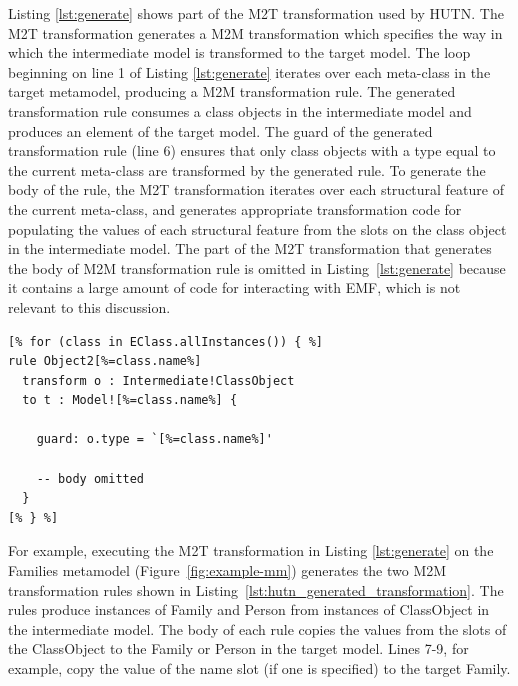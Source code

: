Listing \ref{lst:generate} shows part of the M2T transformation used by HUTN. The M2T transformation generates a M2M transformation which specifies the way in which the intermediate model is transformed to the target model. The loop beginning on line 1 of Listing \ref{lst:generate} iterates over each meta-class in the target metamodel, producing a M2M transformation rule. The generated transformation rule consumes a class objects in the intermediate model and produces an element of the target model. The guard of the generated transformation rule (line 6) ensures that only class objects with a type equal to the current meta-class are transformed by the generated rule. To generate the body of the rule, the M2T transformation iterates over each structural feature of the current meta-class, and generates appropriate transformation code for populating the values of each structural feature from the slots on the class object in the intermediate model. The part of the M2T transformation that generates the body of M2M transformation rule is omitted in Listing~\ref{lst:generate} because it contains a large amount of code for interacting with EMF, which is not relevant to this discussion.

\begin{lstlisting}[caption={[Higher-order transformation with EGL]Part of the M2T transformation (in EGL) for generating the intermediate model to target model transformation (in ETL).}, label=lst:generate, language=EGL]
[% for (class in EClass.allInstances()) { %]
rule Object2[%=class.name%]
  transform o : Intermediate!ClassObject
  to t : Model![%=class.name%] {

    guard: o.type = `[%=class.name%]'

    -- body omitted
  }
[% } %]
\end{lstlisting}

For example, executing the M2T transformation in Listing \ref{lst:generate} on the Families metamodel (Figure~\ref{fig:example-mm}) generates the two M2M transformation rules shown in Listing~\ref{lst:hutn_generated_transformation}. The rules produce instances of Family and Person from instances of ClassObject in the intermediate model. The body of each rule copies the values from the slots of the ClassObject to the Family or Person in the target model. Lines 7-9, for example, copy the value of the name slot (if one is specified) to the target Family.

